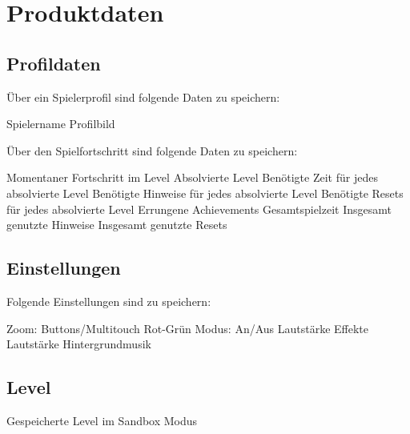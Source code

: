 \section{Produktdaten}

\subsection{Profildaten}
\begin{requirements}
	 Über ein Spielerprofil sind folgende Daten zu speichern:
	\begin{requirements}
		 Spielername
		 Profilbild
	\end{requirements}
	
	 Über den Spielfortschritt sind folgende Daten zu speichern:
	\begin{requirements}
		 Momentaner Fortschritt im Level
		 Absolvierte Level
		 Benötigte Zeit für jedes absolvierte Level
		 Benötigte Hinweise für jedes absolvierte Level
		 Benötigte Resets für jedes absolvierte Level
		 Errungene Achievements
		 Gesamtspielzeit
		 Insgesamt genutzte Hinweise
		 Insgesamt genutzte Resets
	\end{requirements}
\end{requirements}

\subsection{Einstellungen}
\begin{requirements}
	 Folgende Einstellungen sind zu speichern:
	\begin{requirements}
		 Zoom: Buttons/Multitouch
		 Rot-Grün Modus: An/Aus
		 Lautstärke Effekte
		 Lautstärke Hintergrundmusik
	\end{requirements}


\end{requirements}

\subsection{Level}
\begin{requirements}
	 Gespeicherte Level im Sandbox Modus
\end{requirements}
	
